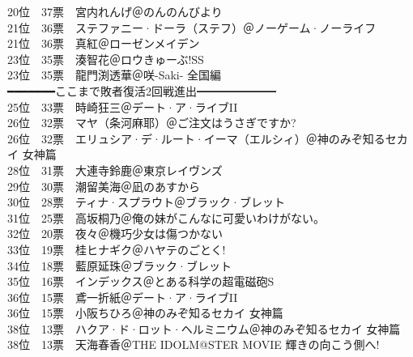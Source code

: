 {    20位　37票　宮内れんげ＠のんのんびより                                             \\
    21位　36票　ステファニー·ドーラ（ステフ）＠ノーゲーム·ノーライフ                 \\
    21位　36票　真紅＠ローゼンメイデン                                                 \\
    23位　35票　湊智花＠ロウきゅーぶ!SS                                                \\
    23位　35票　龍門渕透華＠咲-Saki- 全国編                                            \\
    ━━━━━━━ここまで敗者復活2回戦進出━━━━━━━                              \\
    25位　33票　時崎狂三＠デート·ア·ライブII                                         \\
    26位　32票　マヤ（条河麻耶）＠ご注文はうさぎですか?                                \\
    26位　32票　エリュシア·デ·ルート·イーマ（エルシィ）＠神のみぞ知るセカイ 女神篇  \\
    28位　31票　大連寺鈴鹿＠東京レイヴンズ                                             \\
    29位　30票　潮留美海＠凪のあすから                                                 \\
    30位　28票　ティナ·スプラウト＠ブラック·ブレット                                 \\
    31位　25票　高坂桐乃＠俺の妹がこんなに可愛いわけがない。                           \\
    32位　20票　夜々＠機巧少女は傷つかない                                             \\
    33位　19票　桂ヒナギク＠ハヤテのごとく!                                            \\
    34位　18票　藍原延珠＠ブラック·ブレット                                           \\
    35位　16票　インデックス＠とある科学の超電磁砲S                                    \\
    36位　15票　鳶一折紙＠デート·ア·ライブII                                         \\
    36位　15票　小阪ちひろ＠神のみぞ知るセカイ 女神篇                                  \\
    38位　13票　ハクア·ド·ロット·ヘルミニウム＠神のみぞ知るセカイ 女神篇            \\
    38位　13票　天海春香＠THE IDOLM@STER MOVIE 輝きの向こう側へ!                       \\
}
